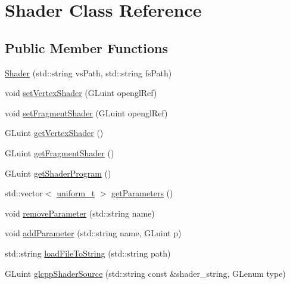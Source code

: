 \hypertarget{classShader}{
\section{Shader Class Reference}
\label{classShader}
}
\subsection*{Public Member Functions}
\begin{DoxyCompactItemize}
\item 
\hyperlink{classShader_a1c078cd1464883c8803d2077f8aa8657}{Shader} (std::string vsPath, std::string fsPath)
\item 
void \hyperlink{classShader_aba0e7f9e1761465551a8dcb8934da0a9}{setVertexShader} (GLuint openglRef)
\item 
void \hyperlink{classShader_ac1f8db8231591c23cc187a458655ed97}{setFragmentShader} (GLuint openglRef)
\item 
GLuint \hyperlink{classShader_a0b852ff20124b535849d5bdf6161b535}{getVertexShader} ()
\item 
GLuint \hyperlink{classShader_ab10406dd15e63d878fa72a8c950b3d67}{getFragmentShader} ()
\item 
GLuint \hyperlink{classShader_ab6bb79b65847071b82cb634df3c49897}{getShaderProgram} ()
\item 
std::vector$<$ \hyperlink{structUniforms__struct}{uniform\_\-t} $>$ \hyperlink{classShader_a4ad2c589dc11ea8f88674b82616f269e}{getParameters} ()
\item 
void \hyperlink{classShader_a50351d8ccac970e9184a20b77fa17103}{removeParameter} (std::string name)
\item 
void \hyperlink{classShader_a3e4bb37e2934150c44c4dad620c218be}{addParameter} (std::string name, GLuint p)
\item 
std::string \hyperlink{classShader_a0aab5075ddd86a52a67ff0477968a8b6}{loadFileToString} (std::string path)
\item 
GLuint \hyperlink{classShader_a1fd891995f7788e3924a0a1cad7bf8ef}{glcppShaderSource} (std::string const \&shader\_\-string, GLenum type)
\end{DoxyCompactItemize}


